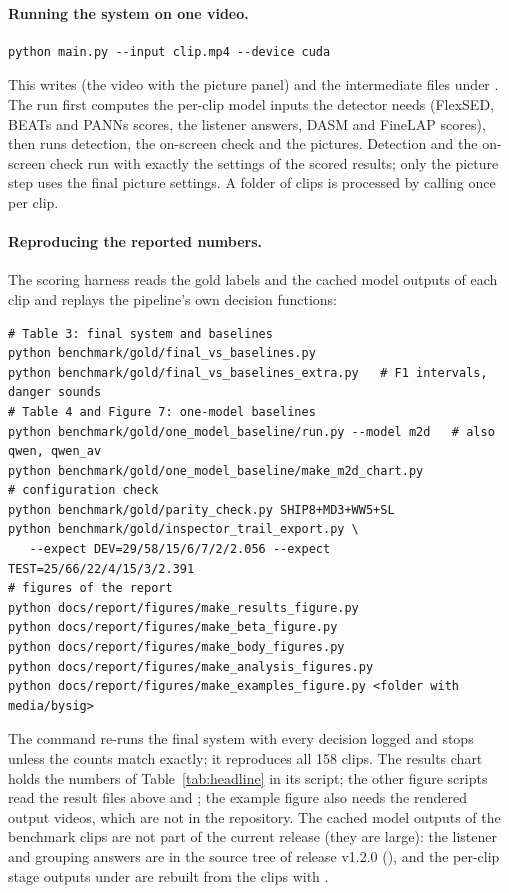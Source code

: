 \paragraph{Running the system on one video.}
\begin{verbatim}
python main.py --input clip.mp4 --device cuda
\end{verbatim}
This writes  (the video with the picture panel) and the intermediate files under
. The run first computes the per-clip model inputs the detector needs (FlexSED, BEATs and PANNs
scores, the listener answers, DASM and FineLAP scores), then runs detection, the on-screen check and the pictures.
Detection and the on-screen check run with exactly the settings of the scored results; only the picture step uses the
final picture settings. A folder of clips is processed by calling  once per clip.

\paragraph{Reproducing the reported numbers.} The scoring harness reads the gold labels and the cached model outputs of
each clip and replays the pipeline's own decision functions:
\begin{verbatim}
# Table 3: final system and baselines
python benchmark/gold/final_vs_baselines.py
python benchmark/gold/final_vs_baselines_extra.py   # F1 intervals, danger sounds
# Table 4 and Figure 7: one-model baselines
python benchmark/gold/one_model_baseline/run.py --model m2d   # also qwen, qwen_av
python benchmark/gold/one_model_baseline/make_m2d_chart.py
# configuration check
python benchmark/gold/parity_check.py SHIP8+MD3+WW5+SL
python benchmark/gold/inspector_trail_export.py \
   --expect DEV=29/58/15/6/7/2/2.056 --expect TEST=25/66/22/4/15/3/2.391
# figures of the report
python docs/report/figures/make_results_figure.py
python docs/report/figures/make_beta_figure.py
python docs/report/figures/make_body_figures.py
python docs/report/figures/make_analysis_figures.py
python docs/report/figures/make_examples_figure.py <folder with media/bysig>
\end{verbatim}
The  command re-runs the final system with every decision logged and stops unless the counts match exactly; it
reproduces all 158 clips. The results chart holds the numbers of Table~\ref{tab:headline} in its script; the other figure scripts read the result files above and ; the
example figure also needs the rendered output videos, which are not in the repository. The cached model outputs of the benchmark clips are not part of the current release (they are
large): the listener and grouping answers are in the source tree of release v1.2.0 (\fp{benchmark/gold/}), and the
per-clip stage outputs under \fp{data/work/} are rebuilt from the clips with \fp{benchmark/gold/clip_prep.py}.

